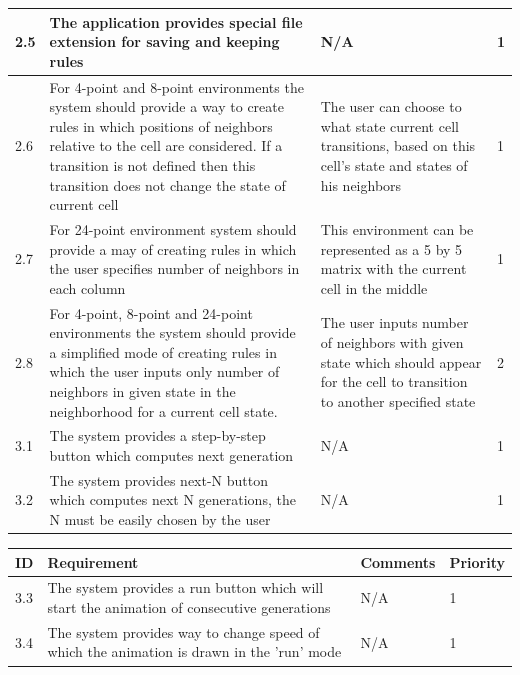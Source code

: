 \documentclass{article}
\begin{document}
\begin{center}
\begin{tabular}{| l | p{7cm} | p{5cm} | l |}
		\hline
		2.5 & 
		The application provides special file extension for saving and keeping rules & 
		N/A &
		1 
		\\ \hline
				
		2.6 &
		For 4-point and 8-point environments the system should provide a way to create rules
		in which positions of neighbors relative to the cell are considered. If
		a transition is not defined then this transition does not change the state of current cell
		 &
		The user can choose to what state current cell transitions, based on this cell's state 
		and states of his neighbors &
		1 
		\\ \hline

		2.7 &
		For 24-point environment system should provide a may of creating rules in which 
		the user specifies number of neighbors in each column
		&	
		This environment can be represented as a 5 by 5 matrix with the current cell in the middle &
		1 
		\\ \hline

		2.8 &
		For 4-point, 8-point and 24-point environments the system should provide a simplified
		mode of creating rules in which the user inputs only number of neighbors in given state
		in the neighborhood for a current cell state. &
		The user inputs number of neighbors with given state which should appear for the
		cell to transition to another specified state &
		2 
		\\ \hline
				
		3.1 & 
		The system provides a step-by-step button which computes next generation & 
		N/A &
		1 
		\\ \hline
		
		3.2 & 
		The system provides next-N button which computes next N generations,
		the N must be easily chosen by the user & 
		N/A &
		1
		\\ \hline



	\end{tabular}
\hspace*{-2.1cm}
	\begin{tabular}{| l | p{7cm} | p{5cm} | l |}
		\hline
	  	ID & Requirement & Comments & Priority \\
	
		\hline
		3.3 & 
		The system provides a run button which will
		start the animation of consecutive generations & 
		N/A &
		1
		\\ \hline
		
		3.4 & 
		The system provides way to change speed of which the animation is drawn in the 'run' mode & 
		N/A &
		1
		\\ \hline


\end{tabular}
\end{center}
\end{document}
